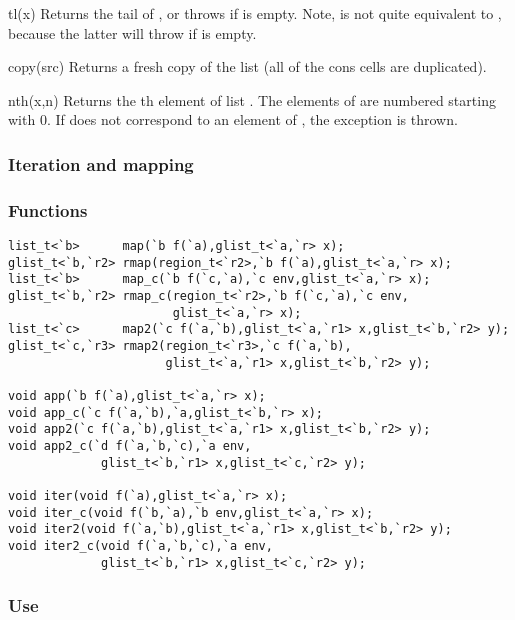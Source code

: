 \begin{defun}{tl}{(x)}
Returns the tail of , or throws  if  is
empty.  Note,  is not quite equivalent to
, because the latter will throw 
if  is empty.
\end{defun}

\begin{defun}{copy}{(src)}
Returns a fresh copy of the list  (all of the cons cells are
duplicated).
\end{defun}

\begin{defun}{nth}{(x,n)}
Returns the th element of list .  The elements of 
are numbered starting with 0.  If  does not correspond to an
element of , the exception  is thrown.
\end{defun}

\subsubsection*{Iteration and mapping}
\subsubsection*{Functions}
\begin{verbatim}
list_t<`b>      map(`b f(`a),glist_t<`a,`r> x);
glist_t<`b,`r2> rmap(region_t<`r2>,`b f(`a),glist_t<`a,`r> x);
list_t<`b>      map_c(`b f(`c,`a),`c env,glist_t<`a,`r> x);
glist_t<`b,`r2> rmap_c(region_t<`r2>,`b f(`c,`a),`c env,
                       glist_t<`a,`r> x);
list_t<`c>      map2(`c f(`a,`b),glist_t<`a,`r1> x,glist_t<`b,`r2> y);
glist_t<`c,`r3> rmap2(region_t<`r3>,`c f(`a,`b),
                      glist_t<`a,`r1> x,glist_t<`b,`r2> y);

void app(`b f(`a),glist_t<`a,`r> x);
void app_c(`c f(`a,`b),`a,glist_t<`b,`r> x);
void app2(`c f(`a,`b),glist_t<`a,`r1> x,glist_t<`b,`r2> y);
void app2_c(`d f(`a,`b,`c),`a env,
             glist_t<`b,`r1> x,glist_t<`c,`r2> y);

void iter(void f(`a),glist_t<`a,`r> x);
void iter_c(void f(`b,`a),`b env,glist_t<`a,`r> x);
void iter2(void f(`a,`b),glist_t<`a,`r1> x,glist_t<`b,`r2> y);
void iter2_c(void f(`a,`b,`c),`a env,
             glist_t<`b,`r1> x,glist_t<`c,`r2> y);
\end{verbatim}

\subsubsection*{Use}

